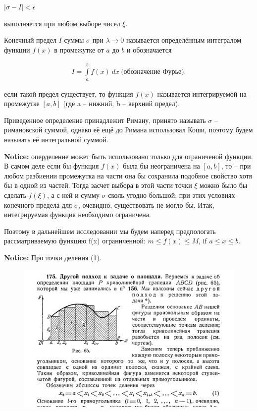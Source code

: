 \documentclass[a4paper]{report}
\begin{document}
$ |\sigma - I| < \epsilon $

\noindent выполняется при любом выборе чисел $ \xi $.

Конечный предел $ I $ суммы $ \sigma $ при $ \lambda \to 0 $ называется
определённым интегралом функции $ f(x) $ в промежутке от $ a $ до $ b $ и обозначается
\begin{center}
    \begin{equation}\label{eq4}
        \begin{gathered}
            I = \int\limits_{a}^{b} f(x)\ dx\ \text{(обозначение Фурье).}
        \end{gathered}
    \end{equation}
\end{center}
\noindent если такой предел существует, то функция $ f(x) $ называется интегрируемой
на промежутке $ [a, b] $ (где a -- нижний, b -- верхний предел).

Приведенное определение принадлежит Риману, принято называть $ \sigma $ -- римановской
суммой, однако её ещё до Римана использовал Коши, поэтому будем называть её интегральной
суммой.

\noindent \textbf{Notice:} оперделение может быть использовано только для ограниченой функции.
В самом деле если бы функция $ f(x) $ была бы неограничена на $ [a, b] $, то
-- при любом разбиении промежутка на части она бы сохранила подобное свойство
хотя бы в одной из частей. Тогда засчет выбора в этой части точки $ \xi $
можно было бы сделать $ f(\xi) $, а с ней и сумму $ \sigma $ сколь угодно большой;
при этих условиях конечного предела для $ \sigma $, очевидно, существовать не могло бы.
Итак, интегрируемая функция необходимо ограничена.

Поэтому в дальнейшем исследовании мы будем наперед предпологать рассматриваемую функцию
f(x) ограниченной: $ m \leq f(x) \leq M $, if $ a \leq x \leq b $.

\newpage
\textbf{Notice:} Про точки деления (1).
\begin{figure}[ht!]
    \centering
    \includegraphics[width=140mm]{int0.png}
\end{figure}
\end{document}
